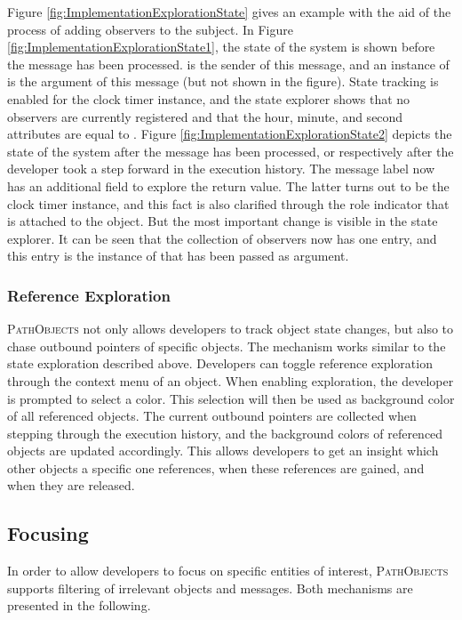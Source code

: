 Figure \ref{fig:ImplementationExplorationState} gives an example with the aid of the process of adding observers to the subject.
In Figure \ref{fig:ImplementationExplorationState1}, the state of the system is shown before the  message has been processed.
 is the sender of this message, and an instance of  is the argument of this message (but not shown in the figure).
State tracking is enabled for the clock timer instance, and the state explorer shows that no observers are currently registered and that the hour, minute, and second attributes are equal to .
Figure \ref{fig:ImplementationExplorationState2} depicts the state of the system after the  message has been processed, or respectively after the developer took a step forward in the execution history.
The message label now has an additional field to explore the return value.
The latter turns out to be the clock timer instance, and this fact is also clarified through the role indicator that is attached to the object.
But the most important change is visible in the state explorer.
It can be seen that the collection of observers now has one entry, and this entry is the instance of  that has been passed as argument.

\subsubsection{Reference Exploration}
\textsc{PathObjects} not only allows developers to track object state changes, but also to chase outbound pointers of specific objects.
The mechanism works similar to the state exploration described above.
Developers can toggle reference exploration through the context menu of an object.
When enabling exploration, the developer is prompted to select a color.
This selection will then be used as background color of all referenced objects.
The current outbound pointers are collected when stepping through the execution history, and the background colors of referenced objects are updated accordingly.
This allows developers to get an insight which other objects a specific one references, when these references are gained, and when they are released.

\subsection{Focusing}
\label{ss:ImplementationFocusing}
In order to allow developers to focus on specific entities of interest, \textsc{PathObjects} supports filtering of irrelevant objects and messages.
Both mechanisms are presented in the following.

